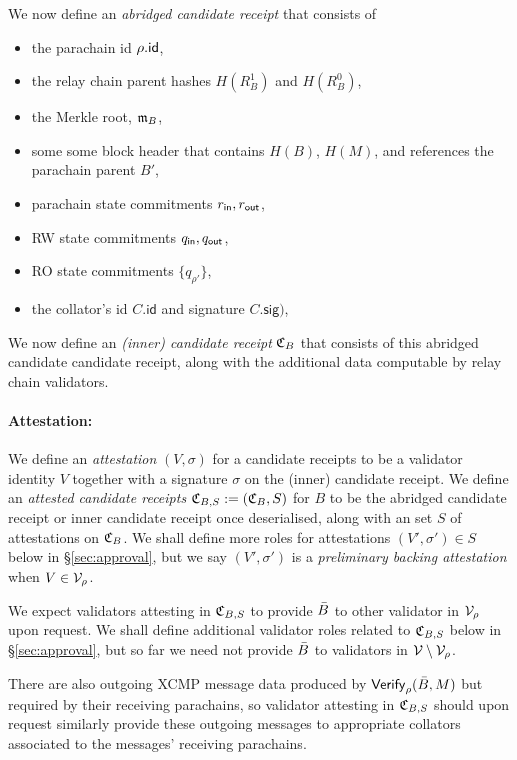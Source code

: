 We now define an {\em abridged candidate receipt} that consists of 
\begin{itemize}
\item the parachain id $\rho.\mathsf{id}$,
\item the relay chain parent hashes $H(R^1_B)$ and $H(R^0_B)$, 
\item the Merkle root, $\mathfrak{m}_B$,
\item some some block header that contains $H(B)$, $H(M)$, and references the parachain parent $B'$,
\item parachain state commitments $r_{\mathsf{in}},r_{\mathsf{out}}$, 
\item RW state commitments $q_{\mathsf{in}},q_{\mathsf{out}}$,
\item RO state commitments $\{ q_{\rho'} \}$,
\item the collator's id $C.\mathsf{id}$ and signature $C.\mathsf{sig})$,
\end{itemize}

We now define an {\em (inner) candidate receipt} $\mathfrak{C}_B$ that consists of this abridged candidate candidate receipt, along with the additional data computable by relay chain validators. %

\smallskip\paragraph{Attestation:}

We define an {\em attestation} $(V,\sigma)$ for a candidate receipts to be a validator identity $V$ together with a signature $\sigma$ on the (inner) candidate receipt.  We define an {\em attested candidate receipts} $\mathfrak{C}_{B,S} := (\mathfrak{C}_B,S)$ for $B$ to be the abridged candidate receipt or inner candidate receipt once deserialised, along with an set $S$ of attestations on $\mathfrak{C}_B$.  We shall define more roles for attestations $(V',\sigma') \in S$ below in \S\ref{sec:approval}, but we say $(V',\sigma')$ is a {\em preliminary backing attestation} when $V \in \mathcal{V}_{\rho}$. 

We expect validators attesting in $\mathfrak{C}_{B,S}$ to provide $\bar{B}$ to other validator in $\mathcal{V}_{\rho}$ upon request.  We shall define additional validator roles related to $\mathfrak{C}_{B,S}$ below in \S\ref{sec:approval}, but so far we need not provide $\bar{B}$ to validators in $\mathcal{V} \setminus \mathcal{V}_{\rho}$.

There are also outgoing XCMP message data produced by $\mathsf{Verify}_{\rho}(\bar{B},M)$ but required by their receiving parachains, so validator attesting in $\mathfrak{C}_{B,S}$ should upon request similarly provide these outgoing messages to appropriate collators associated to the messages' receiving parachains. 

